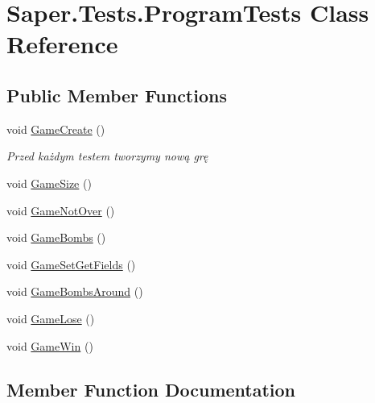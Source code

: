 \hypertarget{class_saper_1_1_tests_1_1_program_tests}{}\section{Saper.\+Tests.\+Program\+Tests Class Reference}
\label{class_saper_1_1_tests_1_1_program_tests}
\subsection*{Public Member Functions}
\begin{DoxyCompactItemize}
\item 
void \mbox{\hyperlink{class_saper_1_1_tests_1_1_program_tests_a9774585fffb849f9c8b33c6e351748d8}{Game\+Create}} ()
\begin{DoxyCompactList}\small\item\em Przed każdym testem tworzymy nową grę \end{DoxyCompactList}\item 
void \mbox{\hyperlink{class_saper_1_1_tests_1_1_program_tests_afef65abd57fa4fd8ef39967855e4c1b2}{Game\+Size}} ()
\item 
void \mbox{\hyperlink{class_saper_1_1_tests_1_1_program_tests_a21d337cc8f3c53f0296a8853c2783818}{Game\+Not\+Over}} ()
\item 
void \mbox{\hyperlink{class_saper_1_1_tests_1_1_program_tests_ad11f91c967457113e7ee5f43c4ff54a1}{Game\+Bombs}} ()
\item 
void \mbox{\hyperlink{class_saper_1_1_tests_1_1_program_tests_afbf5122edc7a9945db74f8ecad4cae41}{Game\+Set\+Get\+Fields}} ()
\item 
void \mbox{\hyperlink{class_saper_1_1_tests_1_1_program_tests_a5385fbe423cd40ca4674ddc0060a2752}{Game\+Bombs\+Around}} ()
\item 
void \mbox{\hyperlink{class_saper_1_1_tests_1_1_program_tests_a8a3221efdf3b62166f012dcf7e1ce68c}{Game\+Lose}} ()
\item 
void \mbox{\hyperlink{class_saper_1_1_tests_1_1_program_tests_a9a2abea95633c70b2845c44e017399cb}{Game\+Win}} ()
\end{DoxyCompactItemize}


\subsection{Member Function Documentation}
\mbox{\label{class_saper_1_1_tests_1_1_program_tests_ad11f91c967457113e7ee5f43c4ff54a1}} 
